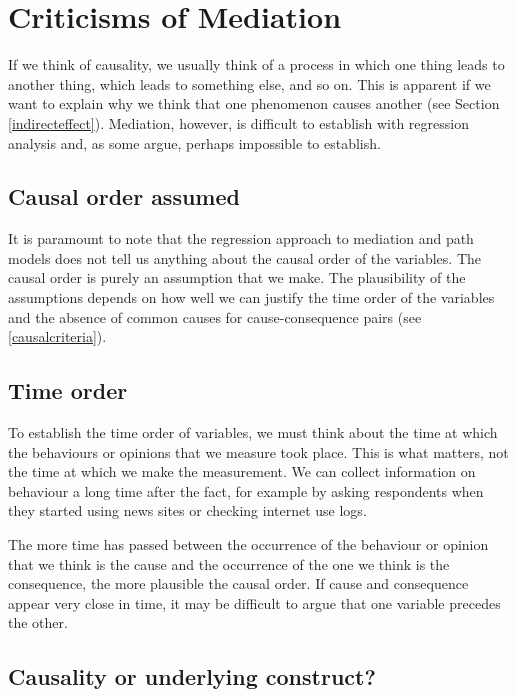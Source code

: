 \documentclass[a4paper]{book}
\theoremstyle{definition}
\theoremstyle{definition}
\theoremstyle{definition}
\theoremstyle{remark}
\begin{document}
\section{Criticisms of Mediation}\label{criticisms-of-mediation}

If we think of causality, we usually think of a process in which one
thing leads to another thing, which leads to something else, and so on.
This is apparent if we want to explain why we think that one phenomenon
causes another (see Section \ref{indirecteffect}). Mediation, however,
is difficult to establish with regression analysis and, as some argue,
perhaps impossible to establish.

\subsection{Causal order assumed}\label{causal-order-assumed}

It is paramount to note that the regression approach to mediation and
path models does not tell us anything about the causal order of the
variables. The causal order is purely an assumption that we make. The
plausibility of the assumptions depends on how well we can justify the
time order of the variables and the absence of common causes for
cause-consequence pairs (see \ref{causalcriteria}).

\subsection{Time order}\label{time-order}

To establish the time order of variables, we must think about the time
at which the behaviours or opinions that we measure took place. This is
what matters, not the time at which we make the measurement. We can
collect information on behaviour a long time after the fact, for example
by asking respondents when they started using news sites or checking
internet use logs.

The more time has passed between the occurrence of the behaviour or
opinion that we think is the cause and the occurrence of the one we
think is the consequence, the more plausible the causal order. If cause
and consequence appear very close in time, it may be difficult to argue
that one variable precedes the other.

\subsection{Causality or underlying
construct?}\label{causality-or-underlying-construct}
\end{document}
